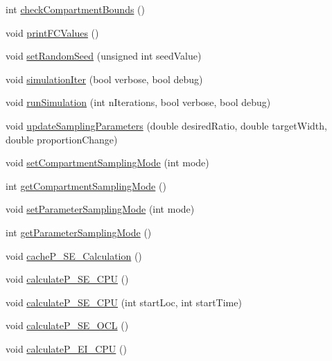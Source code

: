 \begin{DoxyCompactItemize}
\item 
int \hyperlink{classSpatialSEIR_1_1ModelContext_af06b168dc8d9aaebbd04861e7a4f8181}{check\-Compartment\-Bounds} ()
\item 
void \hyperlink{classSpatialSEIR_1_1ModelContext_a846e13b0470616965ea407875f52532c}{print\-F\-C\-Values} ()
\item 
void \hyperlink{classSpatialSEIR_1_1ModelContext_a807197754b6f5b8bb04666de5848ec3d}{set\-Random\-Seed} (unsigned int seed\-Value)
\item 
void \hyperlink{classSpatialSEIR_1_1ModelContext_af29d7173abc3a57dbd065b058e594c91}{simulation\-Iter} (bool verbose, bool debug)
\item 
void \hyperlink{classSpatialSEIR_1_1ModelContext_a582760455a9021e8e208f941747344d2}{run\-Simulation} (int n\-Iterations, bool verbose, bool debug)
\item 
void \hyperlink{classSpatialSEIR_1_1ModelContext_aa813d16b4ffdc46646223fd3da3a384c}{update\-Sampling\-Parameters} (double desired\-Ratio, double target\-Width, double proportion\-Change)
\item 
void \hyperlink{classSpatialSEIR_1_1ModelContext_a9b16c72622a5dc724129828b885d0634}{set\-Compartment\-Sampling\-Mode} (int mode)
\item 
int \hyperlink{classSpatialSEIR_1_1ModelContext_aaae62ac4cd67fe7bc5468214213cdaf3}{get\-Compartment\-Sampling\-Mode} ()
\item 
void \hyperlink{classSpatialSEIR_1_1ModelContext_a7bd0a35f25026a033527ddcaa336576e}{set\-Parameter\-Sampling\-Mode} (int mode)
\item 
int \hyperlink{classSpatialSEIR_1_1ModelContext_a7c69bb2ce3657b025b265ee3a6cd2073}{get\-Parameter\-Sampling\-Mode} ()
\item 
void \hyperlink{classSpatialSEIR_1_1ModelContext_a1172c5fad9e7add3416304f42fd48921}{cache\-P\-\_\-\-S\-E\-\_\-\-Calculation} ()
\item 
void \hyperlink{classSpatialSEIR_1_1ModelContext_afd5a70407a05097e1dbeda4dfd8e90c1}{calculate\-P\-\_\-\-S\-E\-\_\-\-C\-P\-U} ()
\item 
void \hyperlink{classSpatialSEIR_1_1ModelContext_aab0c94a235cc693b1f61ff658fa9e05a}{calculate\-P\-\_\-\-S\-E\-\_\-\-C\-P\-U} (int start\-Loc, int start\-Time)
\item 
void \hyperlink{classSpatialSEIR_1_1ModelContext_ab4136d72b61266483fd36fb914359d13}{calculate\-P\-\_\-\-S\-E\-\_\-\-O\-C\-L} ()
\item 
void \hyperlink{classSpatialSEIR_1_1ModelContext_a29e0e03f136c0c55acfd94d2b858bb8b}{calculate\-P\-\_\-\-E\-I\-\_\-\-C\-P\-U} ()

\end{DoxyCompactItemize}
